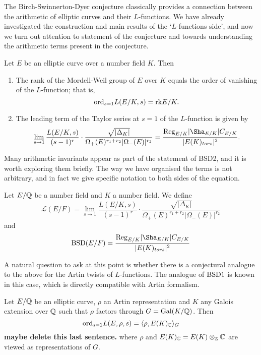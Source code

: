 The Birch-Swinnerton-Dyer conjecture classically provides a connection between the arithmetic of elliptic curves and their $L$-functions. We have already investigated the construction and main results of the `$L$-functions side', and now we turn out attention to statement of the conjecture and towards understanding the arithmetic terms present in the conjecture. 

\begin{conj}[BSD]
    Let $E$ be an elliptic curve over a number field $K$. Then 
    \begin{enumerate}[label={\bfseries  BSD\arabic*.}]
        \item The rank of the Mordell-Weil group of $E$ over $K$ equals the order of vanishing of the $L$-function; that is,
        $$\mathrm{ord}_{s=1}L(E/K,s)=\mathrm{rk} E/K.$$
        \item The leading term of the Taylor series at $s=1$ of the $L$-function is given by 
        \begin{equation}\label{BSD_2}
            \lim_{s\to1}\frac{L(E/K,s)}{(s-1)^r}\cdot\frac{\sqrt{|\Delta_K|}}{\Omega_+(E)^{r_1+r_2}|\Omega_-(E)|^{r_2}}=\frac{\Reg_{E/K}|\Sha_{E/K}|C_{E/K}}{|E(K)_{tors}|^2}.
        \end{equation}
    \end{enumerate}
\end{conj}

Many arithmetic invariants appear as part of the statement of BSD2, and it is worth exploring them briefly. The way we have organised the terms is not arbitrary, and in fact we give specific notation to both sides of the equation. 

\begin{notation}
    Let $E/\mathbb{Q}$ be a number field and $K$ a number field. We define 
    $$\mathcal{L}(E/F)=\lim_{s\to1}\frac{L(E/K,s)}{(s-1)^r}\cdot\frac{\sqrt{|\Delta_K|}}{\Omega_+(E)^{r_1+r_2}|\Omega_-(E)|^{r_2}}$$
    and
    $$\BSD(E/F)=\frac{\Reg_{E/K}|\Sha_{E/K}|C_{E/K}}{|E(K)_{tors}|^2}$$
\end{notation}

A natural question to ask at this point is whether there is a conjectural analogue to the above for the Artin twists of $L$-functions. The analogue of $\mathrm{BSD}1$ is known in this case, which is directly compatible with Artin formalism.

\begin{conj}
    Let $E/\mathbb{Q}$ be an elliptic curve, $\rho$ an Artin representation and $K$ any Galois extension over $\mathbb{Q}$ such that $\rho$ factors through $G=\mathrm{Gal}(K/\mathbb{Q})$. Then
    $$\mathrm{ord}_{s=1}L(E,\rho,s)=\langle\rho,E(K)_{\mathbb{C}}\rangle_G$$
    \textbf{maybe delete this last sentence.} where $\rho$ and $E(K)_{\mathbb{C}}=E(K)\otimes_{\mathbb{Z}}\mathbb{C}$ are viewed as representations of $G$.
\end{conj}

